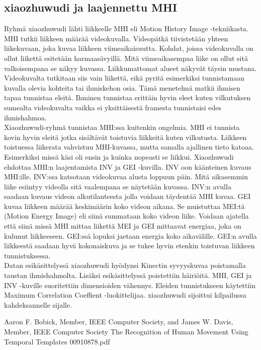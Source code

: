 \subsection{xiaozhuwudi ja laajennettu MHI}
Ryhmä xiaozhuwudi lähti liikkeelle MHI eli Motion History Image -tekniikasta. MHI tutkii liikkeen määrää videokuvalla.
Videopätkä tiivistetään yhteen liikekuvaan, joka kuvaa liikkeen viimeaikaisuutta. Kohdat, joissa videokuvalla on ollut
liikettä esitetään harmaasävyillä. Mitä viimeaikasempaa liike on ollut sitä valkoisempana se näkyy kuvassa. Liikkumattomat
alueet näkyvät täysin mustana. Videokuvalta tutkitaan siis vain liikettä, eikä pyritä esimerkiksi tunnistamaan kuvalla olevia kohteita
tai ihmiskehon osia. Tämä menetelmä matkii ihmisen tapaa tunnistaa eleitä. Ihminen tunnistaa erittäin hyvin eleet kuten vilkutuksen 
sumealta videokuvalta vaikka ei yksittäisestä framesta tunnistaisi edes ihmishahmoa.  \\
Xiaozhuwudi-ryhmä tunnistaa MHI:ssa kuitenkin ongelmia. MHI ei tunnista kovin hyvin eleitä jotka sisältävät toistuvia liikkeitä kuten vilkutusta.
Liikkeen toistuessa liikerata vahvistuu MHI-kuvassa, mutta samalla ajallinen tieto katoaa. Esimerkiksi missä käsi oli ensin ja kuinka nopeasti se liikkui.
Xiaozhuwudi ehdottaa MHI:n laajentamista INV ja GEI -kuvilla. INV oon käänteinen kuvaus MHI:ille. INV:ssa katsotaan videokuvaa alusta loppuun päin.
Mitä aikasemmin liike esiintyy videolla sitä vaalempana se näytetään kuvassa. INV:n avulla saadaan kuvaus videon alkutilanteesta jolla voidaan
täydentää MHI kuvaa. GEI kuvaa liikkeen määrää keskimäärin koko videon aikana. Se muistuttaa MEI:tä (Motion Energy Image) eli siinä summataan
koko videon liike. Voidaan ajatella että siinä missä MHI mittaa liikettä MEI ja GEI mittaavat energiaa, joka on kulunut liikkeeseen. GEI:ssä 
lopuksi jaetaan energia koko aikavälille. GEI:n avulla liikkeestä saadaan hyvä kokonaiskuva ja se tukee hyvin etenkin toistuvan liikkeen tunnistuksessa. \\
Datan esikäsittelyssä xiaozhuwudi hyödynsi Kinectin syvyyskuvaa poistamalla taustan ihmishahmolta. Lisäksi esikäsittelyssä poistettiin häiriöitä.
MHI, GEI ja INV -kuville suoritettiin dimensioiden vähennys. Eleiden tunnistukseen käytettiin Maximum Correlation Coeffient -luokittelijaa.
xiaozhuwudi sijoittui kilpailussa kahdeksannelle sijalle.


Aaron F. Bobick, Member, IEEE Computer Society, and
James W. Davis, Member, IEEE Computer Society
The Recognition of Human Movement Using Temporal Templates
00910878.pdf

